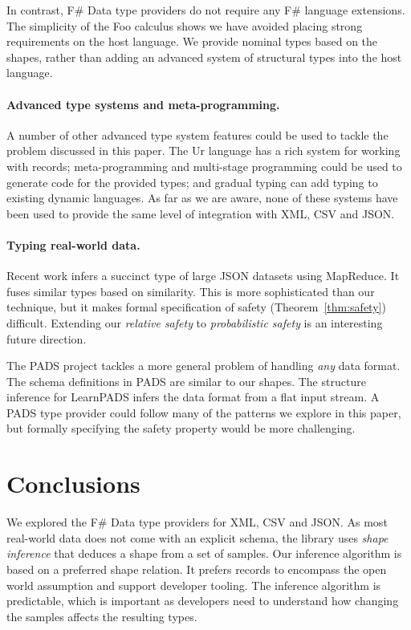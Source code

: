 \documentclass[10pt,nocopyrightspace]{sigplanconf}
\begin{document}
In contrast, F\# Data type providers do not require any F\# language extensions. The simplicity
of the Foo calculus shows we have avoided placing strong requirements on the host language. We
provide nominal types based on the shapes, rather than adding an advanced
system of structural types into the host language.

\paragraph{Advanced type systems and meta-programming.}
A number of other advanced type system features could be used to tackle the problem discussed
in this paper. The Ur \cite{ur} language has a rich system for working with records;
meta-programming \cite{template-hask,th-camlp4} and multi-stage programming \cite{multi-stage}
could be used to generate code for the provided types; and gradual typing \cite{gradual,gradual-js}
can add typing to existing dynamic languages. As far as we are aware, none of these
systems have been used to provide the same level of integration with XML, CSV and JSON.

\paragraph{Typing real-world data.}
Recent work \cite{typing-json} infers a succinct type of large JSON datasets using MapReduce.
It fuses similar types based on similarity. This is more sophisticated than our technique, but it
makes formal specification of safety (Theorem~\ref{thm:safety}) difficult. Extending our
\emph{relative safety} to \emph{probabilistic safety} is an interesting future direction.

The PADS project \cite{pads-dsl,pads-ml} tackles a more general problem of handling \emph{any} data format.
The schema definitions in PADS are similar to our shapes. The structure inference for LearnPADS
\cite{pads-learn} infers the data format from a flat input stream. A PADS type provider could follow
many of the patterns we explore in this paper, but formally specifying the safety property would be
more challenging.

\section{Conclusions}
\label{sec:conclusions}

We explored the F\# Data type providers for XML, CSV and JSON. As most real-world data does not come
with an explicit schema, the library uses \emph{shape inference} that deduces a shape from a set of
samples. Our inference algorithm is based on a preferred shape relation. It prefers records to
encompass the open world assumption and support developer tooling. The inference algorithm is predictable, which is
important as developers need to understand how changing the samples affects the resulting types.
\end{document}
